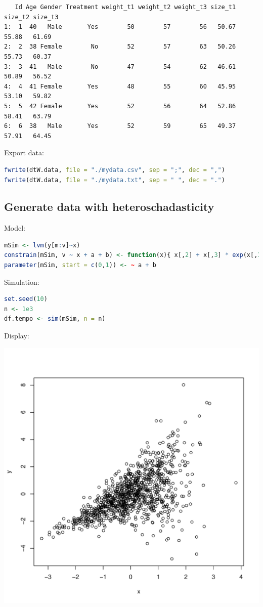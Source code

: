 \documentclass{article}
\begin{document}
\label{}
\begin{verbatim}
   Id Age Gender Treatment weight_t1 weight_t2 weight_t3 size_t1 size_t2 size_t3
1:  1  40   Male       Yes        50        57        56   50.67   55.88   61.69
2:  2  38 Female        No        52        57        63   50.26   55.73   60.37
3:  3  41   Male        No        47        54        62   46.61   50.89   56.52
4:  4  41 Female       Yes        48        55        60   45.95   53.10   59.82
5:  5  42 Female       Yes        52        56        64   52.86   58.41   63.79
6:  6  38   Male       Yes        52        59        65   49.37   57.91   64.45
\end{verbatim}


Export data:
\begin{lstlisting}[language=r,numbers=none]
fwrite(dtW.data, file = "./mydata.csv", sep = ";", dec = ",")
fwrite(dtW.data, file = "./mydata.txt", sep = " ", dec = ".")
\end{lstlisting}
\subsection{Generate data with heteroschadasticity}
\label{sec:org12a2623}

Model:
\begin{lstlisting}[language=r,numbers=none]
mSim <- lvm(y[m:v]~x)
constrain(mSim, v ~ x + a + b) <- function(x){ x[,2] + x[,3] * exp(x[,1]) }
parameter(mSim, start = c(0,1)) <- ~ a + b
\end{lstlisting}

Simulation:
\begin{lstlisting}[language=r,numbers=none]
set.seed(10)
n <- 1e3
df.tempo <- sim(mSim, n = n)
\end{lstlisting}

Display:
\begin{center}
\includegraphics[width=.9\linewidth]{./figures/fig-hetero.pdf}
\label{}
\end{center}
\end{document}
